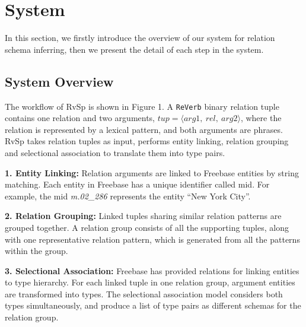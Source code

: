 \section{System}
In this section, we firstly introduce the overview of our system for relation schema inferring,
then we present the detail of each step in the system.

\subsection{System Overview}
The workflow of RvSp is shown in Figure 1.
A {\tt ReVerb} binary relation tuple contains one relation and two arguments, $tup = \langle arg1,\ rel,\ arg2 \rangle$, where
the relation is represented by a lexical pattern, and both arguments are phrases.
RvSp takes relation tuples as input, performs entity linking, relation grouping and
selectional association to translate them into type pairs.

{\bf1.  Entity Linking:} Relation arguments are linked to Freebase entities by string matching.
Each entity in Freebase has a unique identifier called mid. For example, the mid \textit{m.02\_286} represents the entity
``New York City''.

{\bf2. Relation Grouping:} Linked tuples sharing similar relation patterns are grouped together.
A relation group consists of all the supporting tuples, along with one
representative relation pattern, which is generated from all the patterns
within the group.

{\bf3. Selectional Association:} Freebase has provided relations for linking entities to type hierarchy.
For each linked tuple in one relation group, argument entities are transformed into types. The selectional
association model considers both types simultaneously, and produce a list of type pairs as different schemas for the relation group.

